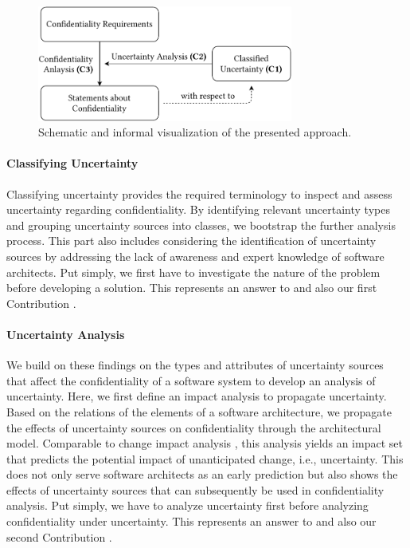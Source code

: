 \begin{figure}
    \centering
    \includegraphics[width=0.75\textwidth]{figures/chapter1/approach.pdf}
    \caption{Schematic and informal visualization of the presented approach.}
    \label{fig:introduction:approach}
\end{figure}

\paragraph{Classifying Uncertainty}
Classifying uncertainty provides the required terminology to inspect and assess uncertainty regarding confidentiality.
By identifying relevant uncertainty types and grouping uncertainty sources into classes, we bootstrap the further analysis process.
This part also includes considering the identification of uncertainty sources by addressing the lack of awareness and expert knowledge of software architects.
Put simply, we first have to investigate the nature of the problem before developing a solution.
This represents an answer to  and also our first Contribution .


\paragraph{Uncertainty Analysis}
We build on these findings on the types and attributes of uncertainty sources that affect the confidentiality of a software system to develop an analysis of uncertainty.
Here, we first define an impact analysis to propagate uncertainty.
Based on the relations of the elements of a software architecture, we propagate the effects of uncertainty sources on confidentiality through the architectural model.
Comparable to change impact analysis \cite{heinrich_methodology_2018,busch_architecture-based_2020,rostami_architecture-based_2015}, this analysis yields an impact set that predicts the potential impact of unanticipated change, i.e., uncertainty.
This does not only serve software architects as an early prediction but also shows the effects of uncertainty sources that can subsequently be used in confidentiality analysis.
Put simply, we have to analyze uncertainty first before analyzing confidentiality under uncertainty.
This represents an answer to  and also our second Contribution .


